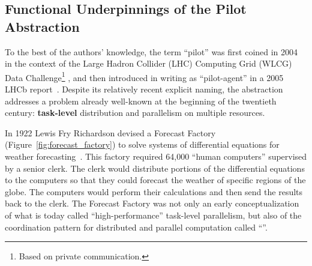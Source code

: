 \documentclass{sig-alternate}
\begin{document}

  


\subsection{Functional Underpinnings of the Pilot Abstraction}
\label{sec:histabstr}

To the best of the authors' knowledge, the term ``pilot'' was first coined in
2004 in the context of the Large Hadron Collider (LHC) Computing Grid (WLCG)
Data Challenge\footnote{Based on private communication.}
\cite{lhc_url,lhc1995large,wlcg_url,bonacorsi2007wlcg}, and then introduced in
writing as ``pilot-agent'' in a 2005 LHCb
report~\cite{nobrega2005lhcb,lhcb_url}. Despite its relatively recent explicit
naming, the \pilot abstraction addresses a problem already well-known at the
beginning of the twentieth century: {\bf task-level} distribution and
parallelism on multiple resources.

In 1922 Lewis Fry Richardson devised a Forecast
Factory~\cite{lynch1999richardson} (Figure~\ref{fig:forecast_factory}) to solve
systems of differential equations for weather
forecasting~\cite{richardson1922weather}. This factory required 64,000 ``human
computers'' supervised by a senior clerk. The clerk would distribute portions of
the differential equations to the computers so that they could forecast the
weather of specific regions of the globe. The computers would perform their
calculations and then send the results back to the clerk. The Forecast Factory
was not only an early conceptualization of what is today called
``high-performance'' task-level parallelism, but also of the coordination
pattern for distributed and parallel computation called ``\MW''.
\end{document}
